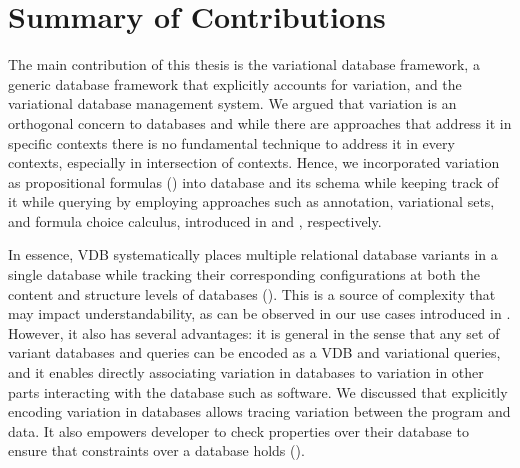 \section{Summary of Contributions}
\label{sec:sum-contr}

The main contribution of this thesis is the variational database framework, 
a generic database framework that explicitly accounts for variation, 
and the variational database management system. 
%
We argued that variation is an orthogonal concern to databases
and while there are approaches that address it in specific contexts
there is no fundamental technique to address it in every contexts, especially in 
intersection of contexts. Hence, we incorporated variation as 
propositional formulas () 
into database and its schema while keeping
track of it while querying by employing approaches such as annotation,
variational sets, and formula choice calculus, introduced in  and
, respectively.
%


In essence, VDB systematically places multiple relational database variants 
in a single database while tracking their corresponding configurations at both
the content and structure levels of databases (). 
%
This is a source of complexity that may impact understandability, as can be
observed in our use cases introduced in . 
However, it also has several advantages: it
is general in the sense that any set of variant databases and queries can be
encoded as a VDB and variational queries, and it enables directly associating variation
in databases to variation in other parts interacting with the database such as software.
%
 We discussed that explicitly encoding variation in databases
 allows  tracing variation between the program and data. It also empowers
 developer to check properties over their database to ensure that
 constraints over a database holds ().


